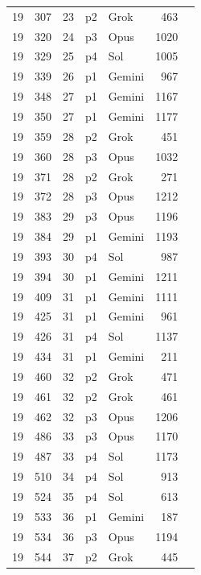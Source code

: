 \begin{longtable}{r r r l l r L{2.3in}}
19 & 307 & 23 & p2 & Grok & 463 &  \\
19 & 320 & 24 & p3 & Opus & 1020 &  \\
19 & 329 & 25 & p4 & Sol & 1005 &  \\
19 & 339 & 26 & p1 & Gemini & 967 &  \\
19 & 348 & 27 & p1 & Gemini & 1167 &  \\
19 & 350 & 27 & p1 & Gemini & 1177 &  \\
19 & 359 & 28 & p2 & Grok & 451 &  \\
19 & 360 & 28 & p3 & Opus & 1032 &  \\
19 & 371 & 28 & p2 & Grok & 271 &  \\
19 & 372 & 28 & p3 & Opus & 1212 &  \\
19 & 383 & 29 & p3 & Opus & 1196 &  \\
19 & 384 & 29 & p1 & Gemini & 1193 &  \\
19 & 393 & 30 & p4 & Sol & 987 &  \\
19 & 394 & 30 & p1 & Gemini & 1211 &  \\
19 & 409 & 31 & p1 & Gemini & 1111 &  \\
19 & 425 & 31 & p1 & Gemini & 961 &  \\
19 & 426 & 31 & p4 & Sol & 1137 &  \\
19 & 434 & 31 & p1 & Gemini & 211 &  \\
19 & 460 & 32 & p2 & Grok & 471 &  \\
19 & 461 & 32 & p2 & Grok & 461 &  \\
19 & 462 & 32 & p3 & Opus & 1206 &  \\
19 & 486 & 33 & p3 & Opus & 1170 &  \\
19 & 487 & 33 & p4 & Sol & 1173 &  \\
19 & 510 & 34 & p4 & Sol & 913 &  \\
19 & 524 & 35 & p4 & Sol & 613 &  \\
19 & 533 & 36 & p1 & Gemini & 187 &  \\
19 & 534 & 36 & p3 & Opus & 1194 &  \\
19 & 544 & 37 & p2 & Grok & 445 &  \\

\end{longtable}
